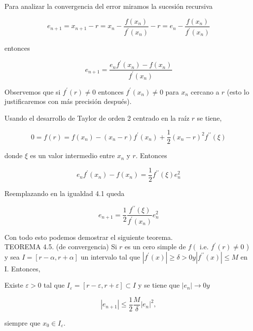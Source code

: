 \documentclass[10pt]{article}
\begin{document}
Para analizar la convergencia del error miramos la sucesión recursiva

$$
e_{n+1}=x_{n+1}-r=x_{n}-\frac{f\left(x_{n}\right)}{f^{\prime}\left(x_{n}\right)}-r=e_{n}-\frac{f\left(x_{n}\right)}{f^{\prime}\left(x_{n}\right)}
$$

entonces


\begin{equation*}
e_{n+1}=\frac{e_{n} f^{\prime}\left(x_{n}\right)-f\left(x_{n}\right)}{f^{\prime}\left(x_{n}\right)} \tag{4.1}
\end{equation*}


Observemos que si $f^{\prime}(r) \neq 0$ entonces $f^{\prime}\left(x_{n}\right) \neq 0$ para $x_{n}$ cercano a $r$ (esto lo justificaremos con más precisión después).

Usando el desarrollo de Taylor de orden 2 centrado en la raíz $r$ se tiene,

$$
0=f(r)=f\left(x_{n}\right)-\left(x_{n}-r\right) f^{\prime}\left(x_{n}\right)+\frac{1}{2}\left(x_{n}-r\right)^{2} f^{\prime \prime}(\xi)
$$

donde $\xi$ es un valor intermedio entre $x_{n}$ y $r$. Entonces

$$
e_{n} f^{\prime}\left(x_{n}\right)-f\left(x_{n}\right)=\frac{1}{2} f^{\prime \prime}(\xi) e_{n}^{2}
$$

Reemplazando en la igualdad 4.1 queda


\begin{equation*}
e_{n+1}=\frac{1}{2} \frac{f^{\prime \prime}(\xi)}{f^{\prime}\left(x_{n}\right)} e_{n}^{2} \tag{4.2}
\end{equation*}


Con todo esto podemos demostrar el siguiente teorema.\\
TEOREMA 4.5. (de convergencia) Si $r$ es un cero simple de $f\left(\right.$ i.e. $f^{\prime}(r) \neq 0$ ) y sea $I= [r-\alpha, r+\alpha]$ un intervalo tal que $\left|f^{\prime}(x)\right| \geq \delta>0 y\left|f^{\prime \prime}(x)\right| \leq M$ en I. Entonces,

Existe $\varepsilon>0$ tal que $I_{\varepsilon}=[r-\varepsilon, r+\varepsilon] \subset I$ y se tiene que $\left|e_{n}\right| \rightarrow 0 y$


\begin{equation*}
\left|e_{n+1}\right| \leq \frac{1}{2} \frac{M}{\delta}\left|e_{n}\right|^{2}, \tag{4.3}
\end{equation*}


siempre que $x_{0} \in I_{\varepsilon}$.
\end{document}
